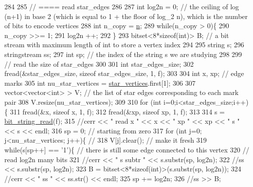 \begin{DoxyCode}
284 
285   \textcolor{comment}{// ==== read star\_edges}
286 
287   \textcolor{keywordtype}{int} log2n = 0; \textcolor{comment}{// the ceiling of log (n+1) in base 2 (which is equal to 1 + the floor of log\_2 n), which
       is the number of bits to encode vertices}
288   \textcolor{keywordtype}{int} n\_copy = \hyperlink{classmarked__graph__compressed_a8d841016ddb11cfd33748c8deb6277ba}{n};
289   \textcolor{keywordflow}{while}(n\_copy > 0)\{
290     n\_copy >>= 1;
291     log2n ++;
292   \}
293   bitset<8*sizeof(int)> B; \textcolor{comment}{// a bit stream with maximum length of int to store a vertex index}
294 
295   \textcolor{keywordtype}{string} s;
296   stringstream ss;
297   \textcolor{keywordtype}{int} sp; \textcolor{comment}{// the index of the string s we are studying }
298 
299   \textcolor{comment}{// read the size of star\_edges}
300 
301   \textcolor{keywordtype}{int} star\_edges\_size;
302   fread(&star\_edges\_size, \textcolor{keyword}{sizeof} star\_edges\_size, 1, f);
303 
304   \textcolor{keywordtype}{int} x, xp; \textcolor{comment}{// edge marks}
305   \textcolor{keywordtype}{int} nu\_star\_vertices = \hyperlink{classmarked__graph__compressed_a7a4ced4586e2e353f9076bd447df5208}{star\_vertices}.first[1];
306 
307   vector<vector<int> > V; \textcolor{comment}{// the list of star edges corresponding to each mark pair}
308   V.resize(nu\_star\_vertices);
309 
310   \textcolor{keywordflow}{for} (\textcolor{keywordtype}{int} i=0;i<star\_edges\_size;i++)\{
311     fread(&x, \textcolor{keyword}{sizeof} x, 1, f);
312     fread(&xp, \textcolor{keyword}{sizeof} xp, 1, f);
313   
314     s = \hyperlink{compression__helper_8cpp_a40e8dcbc036f96b28e003e882c4890b7}{bit\_string\_read}(f);
315     \textcolor{comment}{//cerr << " read  x " << x << " xp " << xp << " s " << s << endl;}
316     sp = 0; \textcolor{comment}{// starting from zero }
317     \textcolor{keywordflow}{for} (\textcolor{keywordtype}{int} j=0; j<nu\_star\_vertices; j++)\{ \textcolor{comment}{// }
318       V[j].clear(); \textcolor{comment}{// make it fresh}
319       \textcolor{keywordflow}{while}(s[sp++] == \textcolor{charliteral}{'1'})\{ \textcolor{comment}{// there is still some edge connected to this vertex }
320         \textcolor{comment}{// read log2n many bits}
321         \textcolor{comment}{//cerr << " s subtr " << s.substr(sp, log2n);}
322         \textcolor{comment}{//ss << s.substr(sp, log2n);}
323         B = bitset<8*sizeof(int)>(s.substr(sp, log2n));
324         \textcolor{comment}{//cerr << " ss " << ss.str() << endl;}
325         sp += log2n;
326         \textcolor{comment}{//ss >> B;}

\end{DoxyCode}

